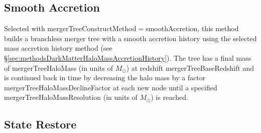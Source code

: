 \subsection{Smooth Accretion}\label{sec:SmoothAccretion}

Selected with {\normalfont \ttfamily mergerTreeConstructMethod}$=${\normalfont \ttfamily smoothAccretion}, this method builds a branchless merger tree with a smooth accretion history using the selected mass accretion history method (see \S\ref{sec:methodsDarkMatterHaloMassAccretionHistory}). The tree has a final mass of {\normalfont \ttfamily mergerTreeHaloMass} (in units of $M_\odot$) at redshift {\normalfont \ttfamily mergerTreeBaseRedshift} and is continued back in time by decreasing the halo mass by a factor {\normalfont \ttfamily mergerTreeHaloMassDeclineFactor} at each new \gls{node} until a specified {\normalfont \ttfamily mergerTreeHaloMassResolution} (in units of $M_\odot$) is reached.

\subsection{State Restore}\label{sec:TreeConstructStateRestore}

